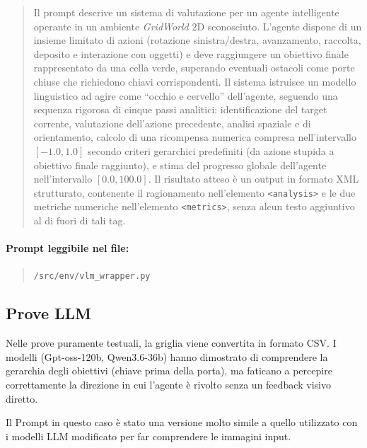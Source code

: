 \documentclass[12pt,a4paper]{article}
\begin{document}
\begin{quote}
Il prompt descrive un sistema di valutazione per un agente intelligente operante in un ambiente \textit{GridWorld} 2D sconosciuto. L'agente dispone di un insieme limitato di azioni (rotazione sinistra/destra, avanzamento, raccolta, deposito e interazione con oggetti) e deve raggiungere un obiettivo finale rappresentato da una cella verde, superando eventuali ostacoli come porte chiuse che richiedono chiavi corrispondenti. Il sistema istruisce un modello linguistico ad agire come ``occhio e cervello'' dell'agente, seguendo una sequenza rigorosa di cinque passi analitici: identificazione del target corrente, valutazione dell'azione precedente, analisi spaziale e di orientamento, calcolo di una ricompensa numerica compresa nell'intervallo $[-1.0, 1.0]$ secondo criteri gerarchici predefiniti (da azione stupida a obiettivo finale raggiunto), e stima del progresso globale dell'agente nell'intervallo $[0.0, 100.0]$. Il risultato atteso è un output in formato XML strutturato, contenente il ragionamento nell'elemento \texttt{<analysis>} e le due metriche numeriche nell'elemento \texttt{<metrics>}, senza alcun testo aggiuntivo al di fuori di tali tag.
\end{quote}

\paragraph{Prompt leggibile nel file:}
\begin{quote}
    \texttt{/src/env/vlm\_wrapper.py}
\end{quote}


\subsection{Prove LLM}
Nelle prove puramente testuali, la griglia viene convertita in formato CSV. I modelli (Gpt-oss-120b, Qwen3.6-36b) hanno dimostrato di comprendere la gerarchia degli obiettivi (chiave prima della porta), ma faticano a percepire correttamente la direzione in cui l'agente è rivolto senza un feedback visivo diretto.

Il Prompt in questo caso è stato una versione molto simile a quello utilizzato con i modelli LLM modificato per far comprendere le immagini input.
\end{document}
